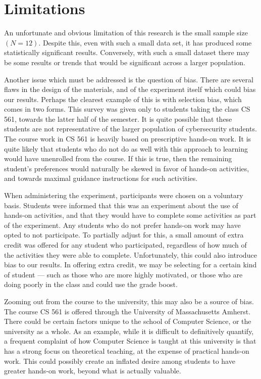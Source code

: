 \section{Limitations}
    An unfortunate and obvious limitation of this research is the small sample size $(N=12)$. 
    Despite this, even with such a small data set, it has produced some statistically significant results. 
    Conversely, with such a small dataset there may be some results or trends that would be significant across a larger population.

    Another issue which must be addressed is the question of bias. 
    There are several flaws in the design of the materials, and of the experiment itself which could bias our results.
    Perhaps the clearest example of this is with selection bias, which comes in two forms. 
    This survey was given only to students taking the class CS 561, towards the latter half of the semester. 
    It is quite possible that these students are not representative of the larger population of cybersecurity students.
    The course work in CS 561 is heavily based on prescriptive hands-on work. 
    It is quite likely that students who do not do as well with this approach to learning would have unenrolled from the course.
    If this is true, then the remaining student's preferences would naturally be skewed in favor of hands-on activities, and towards maximal guidance instructions for such activities.
    
    When administering the experiment, participants were chosen on a voluntary basis. 
    Students were informed that this was an experiment about the use of hands-on activities, and that they would have to complete some activities as part of the experiment. 
    Any students who do not prefer hands-on work may have opted to not participate. 
    To partially adjust for this, a small amount of extra credit was offered for any student who participated, regardless of how much of the activities they were able to complete.
    Unfortunately, this could also introduce bias to our results. 
    In offering extra credit, we may be selecting for a certain kind of student --- such as those who are more highly motivated, or those who are doing poorly in the class and could use the grade boost. 

    Zooming out from the course to the university, this may also be a source of bias. 
    The course CS 561 is offered through the University of Massachusetts Amherst.
    There could be certain factors unique to the school of Computer Science, or the university as a whole.
    As an example, while it is difficult to definitively quantify, a frequent complaint of how Computer Science is taught at this university is that has a strong focus on theoretical teaching, at the expense of practical hands-on work. 
    This could possibly create an inflated desire among students to have greater hands-on work, beyond what is actually valuable. 
    
